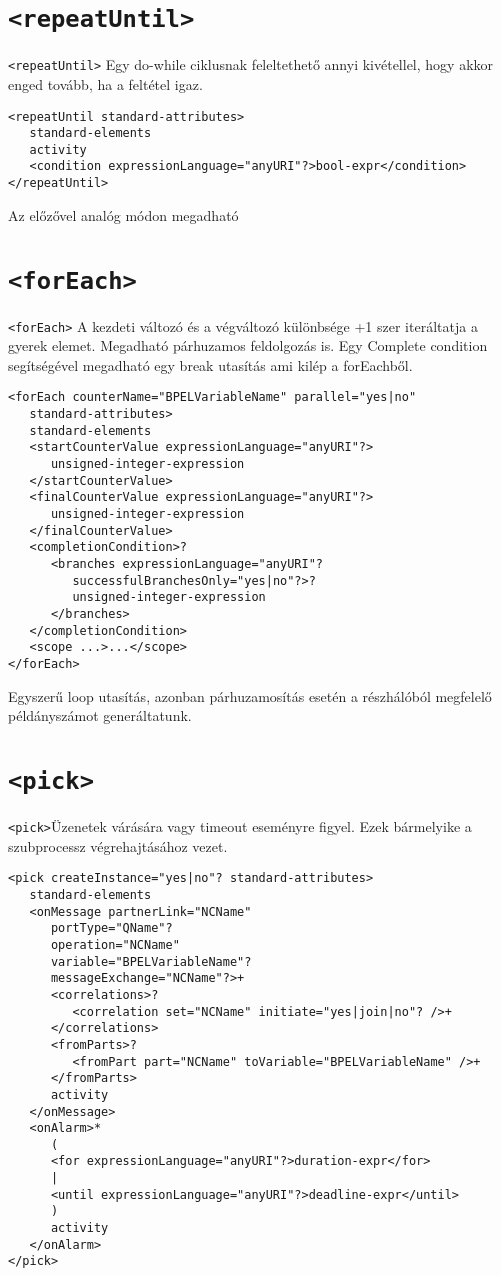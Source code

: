 \section{\texttt{<repeatUntil>}}
\texttt{<repeatUntil>} Egy do-while ciklusnak feleltethető annyi kivétellel, hogy akkor enged tovább, ha a feltétel igaz. 
\begin{verbatim}
<repeatUntil standard-attributes>
   standard-elements
   activity
   <condition expressionLanguage="anyURI"?>bool-expr</condition>
</repeatUntil>
\end{verbatim}
Az előzővel analóg módon megadható

\section{\texttt{<forEach>}}
\texttt{<forEach>} A kezdeti változó és a végváltozó különbsége +1 szer iteráltatja a gyerek elemet. Megadható párhuzamos feldolgozás is. Egy Complete condition segítségével megadható egy break utasítás ami kilép a forEachből. 
\begin{verbatim}
<forEach counterName="BPELVariableName" parallel="yes|no"
   standard-attributes>
   standard-elements
   <startCounterValue expressionLanguage="anyURI"?>
      unsigned-integer-expression
   </startCounterValue>
   <finalCounterValue expressionLanguage="anyURI"?>
      unsigned-integer-expression
   </finalCounterValue>
   <completionCondition>?
      <branches expressionLanguage="anyURI"?
         successfulBranchesOnly="yes|no"?>?
         unsigned-integer-expression
      </branches>
   </completionCondition>
   <scope ...>...</scope>
</forEach>
\end{verbatim} Egyszerű loop utasítás, azonban párhuzamosítás esetén a részhálóból megfelelő példányszámot generáltatunk. 

\section{\texttt{<pick>}}
\texttt{<pick>}Üzenetek várására vagy timeout eseményre figyel. Ezek bármelyike a szubprocessz végrehajtásához vezet. 
\begin{verbatim}
<pick createInstance="yes|no"? standard-attributes>
   standard-elements
   <onMessage partnerLink="NCName"
      portType="QName"?
      operation="NCName"
      variable="BPELVariableName"?
      messageExchange="NCName"?>+
      <correlations>?
         <correlation set="NCName" initiate="yes|join|no"? />+
      </correlations>
      <fromParts>?
         <fromPart part="NCName" toVariable="BPELVariableName" />+
      </fromParts>
      activity
   </onMessage>
   <onAlarm>*
      (
      <for expressionLanguage="anyURI"?>duration-expr</for>
      |
      <until expressionLanguage="anyURI"?>deadline-expr</until>
      )
      activity
   </onAlarm>
</pick>
\end{verbatim}

